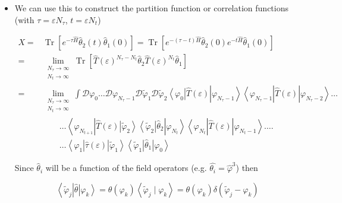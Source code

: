 \begin{itemize}
with \(C=\left(a^{d} / 2 \pi \varepsilon\right)^{N^{d} / 2}\)\\
which depends on the fields on timeslice \(s\) and \(s+1\)

  \item We can use this to construct the partition function or correlation functions (with $\tau=\varepsilon N_{\tau}$, $t=\varepsilon N_{t}$)

\begin{equation}
\begin{aligned}
X =&\operatorname{Tr}\left[e^{-\tau \hat H} \hat{\theta}_{2}(t) \hat{\theta}_{1}(0)\right]=\operatorname{Tr}\left[e^{-(\tau-t) \hat{H}} \hat{\theta}_{2}(0) e^{-t \hat{H}} \hat{\theta}_{1}(0)\right] \\
=&\lim _{\substack{N_{\tau} \rightarrow \infty \\
N_{t} \rightarrow \infty}} \operatorname{Tr}\left[\hat{T}(\varepsilon)^{N_{\tau}-N_{t}} \hat{\theta}_{2} \hat{T}(\varepsilon)^{N_{t}} \hat{\theta}_{1}\right]  \\
=&\lim _{\substack{N_{\tau} \rightarrow \infty \\
N_{t} \rightarrow \infty}} \int \mathcal{D} \varphi_{0} \ldots \mathcal{D} \varphi_{N_{\tau}-1} \mathcal{D} \widetilde{\varphi}_{1} \mathcal{D} \widetilde{\varphi}_{2}\left\langle\varphi_{0}\right| \hat{T}(\varepsilon)\left|\varphi_{N_{\tau}-1}\right\rangle\left\langle\varphi_{N_{\tau}-1}\right| \hat{T}(\varepsilon)\left|\varphi_{N_{\tau}-2}\right\rangle \ldots \\
&\qquad  \ldots\left\langle\varphi_{N_{t+1}}\right| \hat{T}(\varepsilon)\left|\widetilde{\varphi}_{2}\right\rangle\left\langle\widetilde{\varphi}_{2}\right| \hat{\theta}_{2}\left|\varphi_{N_{t}}\right\rangle\left\langle\varphi_{N_{t}}\right| \hat{T}(\varepsilon)\left|\varphi_{N_{t}-1}\right\rangle \ldots . \\
& \qquad \ldots\left\langle\varphi_{1}\right| \hat{\tau}(\varepsilon)\left|\widetilde{\varphi}_{1}\right\rangle\left\langle\widetilde{\varphi}_{1}\right| \hat{\theta}_{1}\left|\varphi_{0}\right\rangle
\end{aligned}
\end{equation}


Since \(\hat{\theta}_{i}\) will be a function of the field operators (e.g. $\hat{\theta_i} = \hat{\varphi}^3$) then

\begin{equation}
\left\langle\tilde{\varphi}_{j}\right| \hat{\theta}\left|\varphi_{k}\right\rangle=\theta\left(\varphi_{k}\right)\left\langle\tilde{\varphi}_{j} \mid \varphi_{k}\right\rangle=\theta\left(\varphi_{k}\right) \delta\left(\tilde{\varphi}_{j}-\varphi_{k}\right)
\end{equation}


\end{itemize}
